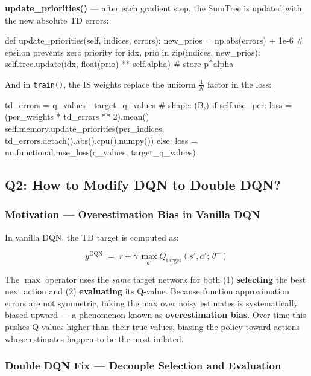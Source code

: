 \documentclass[12pt,a4paper]{report}
\begin{document}
\textbf{update\_priorities()} — after each gradient step, the SumTree is updated with
the new absolute TD errors:

\begin{pycode}
def update_priorities(self, indices, errors):
    new_prios = np.abs(errors) + 1e-6          # epsilon prevents zero priority
    for idx, prio in zip(indices, new_prios):
        self.tree.update(idx, float(prio) ** self.alpha)   # store p^alpha
\end{pycode}

And in \texttt{train()}, the IS weights replace the uniform $\frac{1}{N}$ factor in the loss:

\begin{pycode}
td_errors = q_values - target_q_values          # shape: (B,)
if self.use_per:
    loss = (per_weights * td_errors ** 2).mean()
    self.memory.update_priorities(per_indices,
                                  td_errors.detach().abs().cpu().numpy())
else:
    loss = nn.functional.mse_loss(q_values, target_q_values)
\end{pycode}

\newpage

\subsection*{Q2: How to Modify DQN to Double DQN?}

\subsubsection*{Motivation — Overestimation Bias in Vanilla DQN}

In vanilla DQN, the TD target is computed as:

\begin{equation}
  y^{\text{DQN}} \;=\; r + \gamma\,\max_{a'} Q_{\text{target}}(s', a';\,\theta^-)
\end{equation}

The $\max$ operator uses the \emph{same} target network for both
(1) \textbf{selecting} the best next action and
(2) \textbf{evaluating} its Q-value.
Because function approximation errors are not symmetric,
taking the max over noisy estimates is systematically biased upward ---
a phenomenon known as \textbf{overestimation bias}.
Over time this pushes Q-values higher than their true values,
biasing the policy toward actions whose estimates happen to be the most inflated.

\subsubsection*{Double DQN Fix — Decouple Selection and Evaluation}
\end{document}
